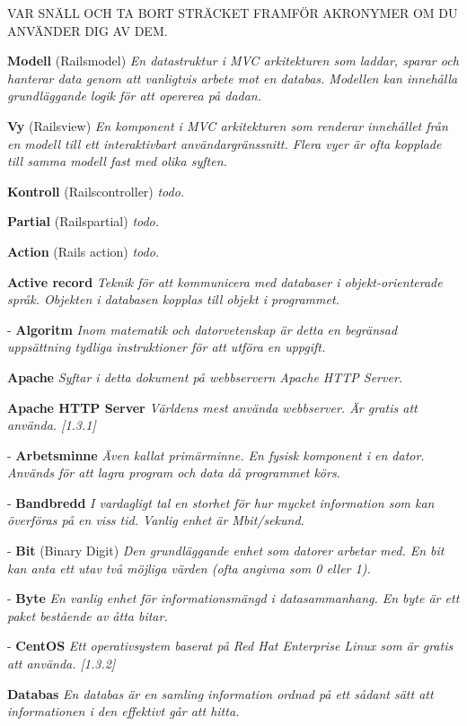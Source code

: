 \documentclass[a4paper, twoside, 11pt, titlepage]{article}
\begin{document}
	VAR SNÄLL OCH TA BORT STRÄCKET FRAMFÖR AKRONYMER OM DU ANVÄNDER DIG AV DEM.

	\textbf{Modell} (Railsmodel) \emph{En datastruktur i MVC arkitekturen som laddar, sparar och hanterar data genom att vanligtvis arbete mot en databas. Modellen kan innehålla grundläggande logik för att opererea på dadan.}

	\textbf{Vy} (Railsview) \emph{En komponent i MVC arkitekturen som renderar innehållet från en modell till ett interaktivbart användargränssnitt. Flera vyer är ofta kopplade till samma modell fast med olika syften.}

	\textbf{Kontroll} (Railscontroller) \emph{todo.}

	\textbf{Partial} (Railspartial) \emph{todo.}

	\textbf{Action} (Rails action) \emph{todo.}

	\textbf{Active record} \emph{Teknik för att kommunicera med databaser i objekt-orienterade språk. Objekten i databasen kopplas till objekt i programmet.}

	- \textbf{Algoritm} \emph{Inom matematik och datorvetenskap är detta en begränsad uppsättning tydliga instruktioner för att utföra en uppgift.}

	\textbf{Apache} \emph{Syftar i detta dokument på webbservern Apache HTTP Server.}

	\textbf{Apache HTTP Server} \emph{Världens mest använda webbserver. Är gratis att använda. [1.3.1]}

	- \textbf{Arbetsminne} \emph{Även kallat primärminne. En fysisk komponent i en dator. Används för att lagra program och data då programmet körs.}

	- \textbf{Bandbredd} \emph{I vardagligt tal en storhet för hur mycket information som kan överföras på en viss tid. Vanlig enhet är Mbit/sekund.}

	- \textbf{Bit} (Binary Digit) \emph{Den grundläggande enhet som datorer arbetar med. En bit kan anta ett utav två möjliga värden (ofta angivna som 0 eller 1).}

	- \textbf{Byte} \emph{En vanlig enhet för informationsmängd i datasammanhang. En byte är ett paket bestående av åtta bitar.}

	- \textbf{CentOS} \emph{Ett operativsystem baserat på Red Hat Enterprise Linux som är gratis att använda. [1.3.2]}

	\textbf{Databas} \emph{En databas är en samling information ordnad på ett sådant sätt att informationen i den effektivt går att hitta.}
\end{document}
